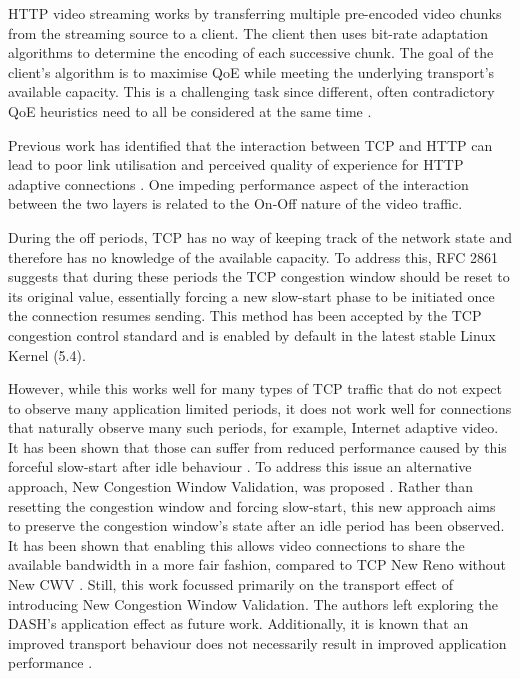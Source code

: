 \documentclass[10pt,sigconf,anonymous]{acmart}
\begin{document}
HTTP video streaming works by transferring multiple pre-encoded video chunks from the streaming source to a client. The client then uses bit-rate adaptation algorithms to determine the encoding of each successive chunk. The goal of the client's algorithm is to maximise QoE while meeting the underlying transport's available capacity. This is a challenging task since different, often contradictory QoE heuristics need to all be considered at the same time \cite{Seufert-2015-A-Survey-on-QoE-Dash}. 

Previous work has identified that the interaction between TCP and HTTP can lead to poor link utilisation and perceived quality of experience for HTTP adaptive connections \cite{Bae-2015-why-is-http-streaming-hard,Esteban-2012-Interactions-HTTP-TCP}. One impeding performance aspect of the interaction between the two layers is related to the On-Off nature of the video traffic.

During the off periods, TCP has no way of keeping track of the network state and therefore has no knowledge of the available capacity. To address this, RFC 2861 \cite{rfc2861-2000-padhye-congestion-window-validation} suggests that during these periods the TCP congestion window should be reset to its original value, essentially forcing a new slow-start phase to be initiated once the connection resumes sending. This method has been accepted by the TCP congestion control standard \cite{rfc5681-congeston-control} and is enabled by default in the latest stable Linux Kernel (5.4).

However, while this works well for many types of TCP traffic that do not expect to observe many application limited periods, it does not work well for connections that naturally observe many such periods, for example, Internet adaptive video. It has been shown that those can suffer from reduced performance caused by this forceful slow-start after idle behaviour \cite{Esteban-2012-Interactions-HTTP-TCP}. To address this issue an alternative approach, New Congestion Window Validation, was proposed \cite{rfc7661-2015-fairhurst-new-cwnd-validation}. Rather than resetting the congestion window and forcing slow-start, this new approach aims to preserve the congestion window's state after an idle period has been observed. It has been shown that enabling this allows video connections to share the available bandwidth in a more fair fashion, compared to TCP New Reno without New CWV \cite{Nazir-2014-performance-evaluation-congestion-window-validation-dash-newcwv}. Still, this work focussed primarily on the transport effect of introducing New Congestion Window Validation. The authors left exploring the DASH's application effect as future work. Additionally, it is known that an improved transport behaviour does not necessarily result in improved application performance \cite{Spiteri-2016-BOLA}.
\end{document}
